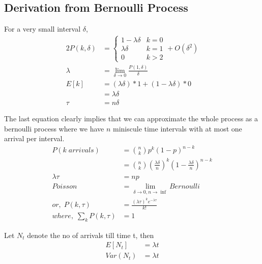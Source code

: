 \documentclass[11pt, a4paper]{article}
\begin{document}
    \subsection{Derivation from Bernoulli Process}
    For a very small interval $\delta$,
    \begin{alignat*}{2}
        P(k, \delta) &= \begin{cases} 1-\lambda \delta &\mbox{$k = 0$}\\
                                     \lambda \delta &\mbox{$k = 1$}\\
                                     0 &\mbox{$k > 2$} \end{cases} + O(\delta^{2})\\
        \lambda &= \lim_{\delta \to 0}\frac{P(1,\delta)}{\delta} \tag*{arrival rate per unit time}\\
        E[k] &= (\lambda \delta) * 1 + (1-\lambda \delta) * 0\\
            &= \lambda \delta \\
        \tau &= n \delta
    \end{alignat*}
    
    The last equation clearly implies that we can approximate the whole process as a bernoulli process where we have $n$ miniscule time intervals with at most one arrival per interval.
    \begin{align*}
        P(k\; arrivals) &= \binom{n}{k} p^{k} (1-p)^{n-k} \\
            &= \binom{n}{k} (\frac{\lambda \delta}{n})^{k} (1 - \frac{\lambda \delta}{n})^{n-k}\\
        \lambda \tau &= np \tag*{or, arrival rate * time = E[arrivals]}\\
        Poisson &= \lim_{\delta \to 0, n \to \inf} Bernoulli\\
        or,\; P(k, \tau) &= \frac{(\lambda \tau)^{k} e^{-\lambda \tau}}{k!} \tag*{$k = 0,1, \cdots$, for a given $\tau$}\\
        where,\; \sum_{k} P(k, \tau) &= 1 \tag*{for a given $\tau$}
    \end{align*}

    Let $N_{t}$ denote the no of arrivals till time t, then
    \begin{align*}
        E[N_{t}] &= \lambda t\\
        Var(N_{t}) &= \lambda t
    \end{align*}
\end{document}
